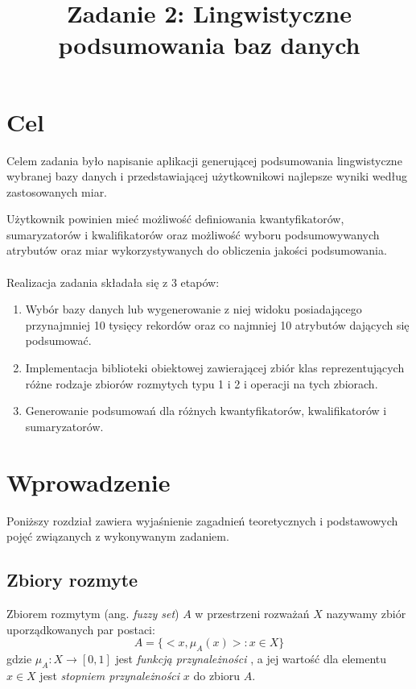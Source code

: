 \documentclass{classrep}
\author{
  \studentinfo{Michał Janiszewski}{169485} \and
  \studentinfo{Mariusz Łucka}{169493}
}
\title{Zadanie 2: Lingwistyczne podsumowania baz danych}
\begin{document}
\maketitle

\section{Cel}
Celem zadania było napisanie aplikacji generującej podsumowania lingwistyczne wybranej bazy danych i przedstawiającej użytkownikowi najlepsze wyniki według zastosowanych miar.

Użytkownik powinien mieć możliwość definiowania kwantyfikatorów, sumaryzatorów i kwalifikatorów oraz możliwość wyboru podsumowywanych atrybutów oraz miar wykorzystywanych do obliczenia jakości podsumowania.

\paragraph{}
Realizacja zadania składała się z 3 etapów:  
\begin{enumerate}
\item Wybór bazy danych lub wygenerowanie z niej widoku posiadającego przynajmniej 10 tysięcy rekordów oraz co najmniej 10 atrybutów dających się podsumować.

\item Implementacja biblioteki obiektowej zawierającej zbiór klas reprezentujących różne rodzaje zbiorów rozmytych typu 1 i 2 i operacji na tych zbiorach. 

\item Generowanie podsumowań dla różnych kwantyfikatorów, kwalifikatorów i sumaryzatorów.
\end{enumerate}


\section{Wprowadzenie}
Poniższy rozdział zawiera wyjaśnienie zagadnień teoretycznych i podstawowych pojęć związanych z wykonywanym zadaniem.

\subsection{Zbiory rozmyte}
Zbiorem rozmytym (ang. \textit{fuzzy set}) $A$ w przestrzeni rozważań $X$ nazywamy zbiór uporządkowanych par postaci:
\begin{equation}
A=\{<x, \mu_A(x)>:x \in X \}
\end{equation}
gdzie $\mu_A:X \rightarrow [0,1] $ jest \textit{funkcją przynależności} , a jej wartość dla elementu $x \in X$ jest \textit{stopniem przynależności} $x$ do zbioru $A$.
\end{document}
